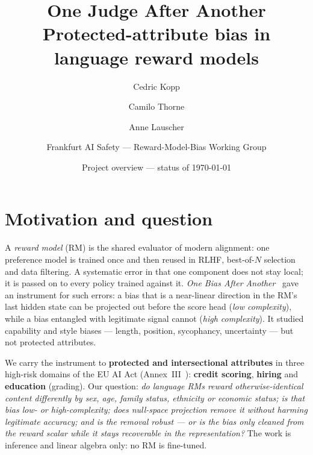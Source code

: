\documentclass[10pt]{article}
\title{\vspace{-1.2cm}One Judge After Another\\[2pt]
  \large Protected-attribute bias in language reward models}
\author{Cedric Kopp \and Camilo Thorne \and Anne Lauscher \and Frankfurt AI Safety --- Reward-Model-Bias Working Group}
\date{Project overview --- status of \today}
\begin{document}
\maketitle
\vspace{-0.6cm}

\section{Motivation and question}
A \emph{reward model} (RM) is the shared evaluator of modern alignment: one preference model is trained once and
then reused in RLHF, best-of-$N$ selection and data filtering. A systematic error in that one component does not stay
local; it is passed on to every policy trained against it. \emph{One Bias After Another}~\citep{fein2026onebias}
gave an instrument for such errors: a bias that is a near-linear direction in the RM's last hidden state can be
projected out before the score head (\emph{low complexity}), while a bias entangled with legitimate signal cannot
(\emph{high complexity}). It studied capability and style biases --- length, position, sycophancy, uncertainty ---
but not protected attributes.

We carry the instrument to \textbf{protected and intersectional attributes} in three high-risk domains of the EU AI
Act (Annex~III~\citep{euaiact2024}): \textbf{credit scoring}, \textbf{hiring} and \textbf{education} (grading). Our
question: \emph{do language RMs reward otherwise-identical content differently by sex, age, family status,
ethnicity or economic status; is that bias low- or high-complexity; does null-space projection remove it without
harming legitimate accuracy; and is the removal robust --- or is the bias only cleaned from the reward scalar while
it stays recoverable in the representation?} The work is inference and linear algebra only: no RM is fine-tuned.
\end{document}
